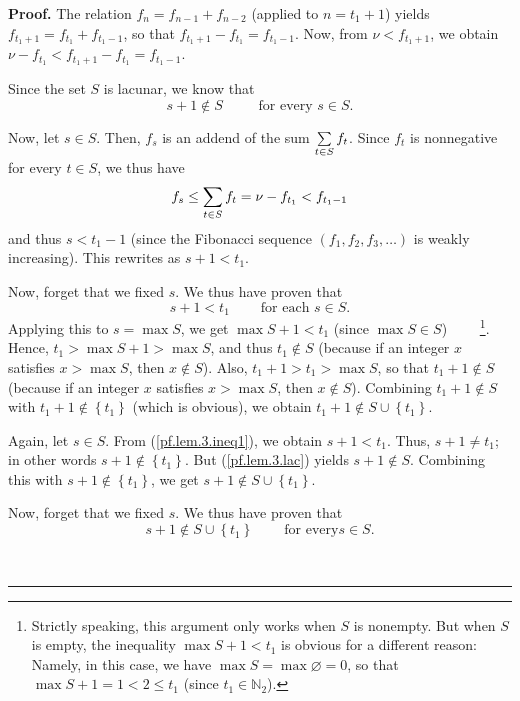 \documentclass[numbers=enddot,12pt,final,onecolumn,notitlepage]{scrartcl}%
\numberwithin{exer}{section}
\theoremstyle{definition}
\newenvironment{proof}[1][Proof]{\noindent\textbf{#1.} }{\ \rule{0.5em}{0.5em}}
\let\sumnonlimits\sum
\renewcommand{\sum}{\sumnonlimits\limits}
\begin{document}
\begin{proof}
The relation $f_{n}=f_{n-1}+f_{n-2}$ (applied to $n=t_{1}+1$) yields
$f_{t_{1}+1}=f_{t_{1}}+f_{t_{1}-1}$, so that $f_{t_{1}+1}-f_{t_{1}}%
=f_{t_{1}-1}$. Now, from $\nu<f_{t_{1}+1}$, we obtain $\nu-f_{t_{1}}%
<f_{t_{1}+1}-f_{t_{1}}=f_{t_{1}-1}$.

Since the set $S$ is lacunar, we know that
\begin{equation}
s+1\notin S\ \ \ \ \ \ \ \ \ \ \text{ for every }s\in S. \label{pf.lem.3.lac}%
\end{equation}


Now, let $s\in S$. Then, $f_{s}$ is an addend of the sum $\sum\limits_{t\in
S}f_{t}$. Since $f_{t}$ is nonnegative for every $t\in S$, we thus have%
\[
f_{s}\leq\sum\limits_{t\in S}f_{t}=\nu-f_{t_{1}}<f_{t_{1}-1}%
\]
and thus $s<t_{1}-1$ (since the Fibonacci sequence $\left(  f_{1},f_{2}%
,f_{3},\ldots\right)  $ is weakly increasing). This rewrites as $s+1<t_{1}$.

Now, forget that we fixed $s$. We thus have proven that
\begin{equation}
s+1<t_{1}\ \ \ \ \ \ \ \ \ \ \text{for each }s\in S. \label{pf.lem.3.ineq1}%
\end{equation}
Applying this to $s=\max S$, we get $\max S+1<t_{1}$ (since $\max S\in S$)
\ \ \ \ \footnote{Strictly speaking, this argument only works when $S$ is
nonempty. But when $S$ is empty, the inequality $\max S+1<t_{1}$ is obvious
for a different reason: Namely, in this case, we have $\max S=\max
\varnothing=0$, so that $\max S+1=1<2\leq t_{1}$ (since $t_{1}\in
\mathbb{N}_{2}$).}. Hence, $t_{1}>\max S+1>\max S$, and thus $t_{1}\notin S$
(because if an integer $x$ satisfies $x>\max S$, then $x\notin S$). Also,
$t_{1}+1>t_{1}>\max S$, so that $t_{1}+1\notin S$ (because if an integer $x$
satisfies $x>\max S$, then $x\notin S$). Combining $t_{1}+1\notin S$ with
$t_{1}+1\notin\left\{  t_{1}\right\}  $ (which is obvious), we obtain
$t_{1}+1\notin S\cup\left\{  t_{1}\right\}  $.

Again, let $s\in S$. From (\ref{pf.lem.3.ineq1}), we obtain $s+1<t_{1}$. Thus,
$s+1\neq t_{1}$; in other words $s+1\notin\left\{  t_{1}\right\}  $. But
(\ref{pf.lem.3.lac}) yields $s+1\notin S$. Combining this with $s+1\notin%
\left\{  t_{1}\right\}  $, we get $s+1\notin S\cup\left\{  t_{1}\right\}  $.

Now, forget that we fixed $s$. We thus have proven that%
\begin{equation}
s+1\notin S\cup\left\{  t_{1}\right\}  \ \ \ \ \ \ \ \ \ \ \text{for every
}s\in S. \label{pf.lem.3.notin1}%
\end{equation}



\end{proof}
\end{document}
